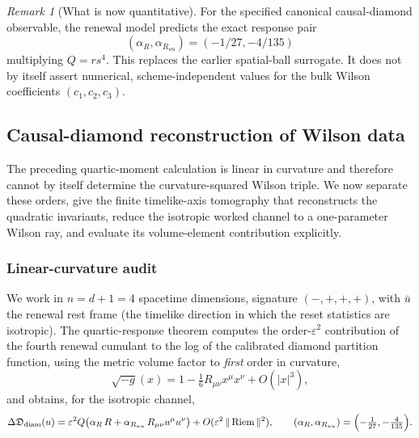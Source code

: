\documentclass[11pt]{article}
\theoremstyle{definition}
\theoremstyle{remark}
\newtheorem{remark}[theorem]{Remark}
\newcommand{\eps}{\varepsilon}
\newcommand{\Riem}{\operatorname{Riem}}
\begin{document}
\begin{remark}[What is now quantitative]
\label{rem:diamond-response-scope}
For the specified canonical causal-diamond observable, the renewal model predicts
the exact response pair
\[
 (\alpha_R,\alpha_{R_{uu}})=(-1/27,-4/135)
\]
multiplying $Q=rs^4$.  This replaces the earlier spatial-ball surrogate.
It does not by itself assert numerical, scheme-independent values for the bulk
Wilson coefficients $(c_1,c_2,c_3)$.
\end{remark}


\subsection{Causal-diamond reconstruction of Wilson data}
\label{subsec:covariant-wilson-reconstruction}

The preceding quartic-moment calculation is linear in curvature and therefore cannot by itself determine the curvature-squared Wilson triple.  We now separate these orders, give the finite timelike-axis tomography that reconstructs the quadratic invariants, reduce the isotropic worked channel to a one-parameter Wilson ray, and evaluate its volume-element contribution explicitly.

\subsubsection{Linear-curvature audit}
\label{subsec:curvature-order-audit}

We work in $n=d+1=4$ spacetime dimensions, signature $(-,+,+,+)$, with $\bar u$
the renewal rest frame (the timelike direction in which the reset statistics are
isotropic).  The quartic-response theorem computes the order-$\eps^2$
contribution of the fourth renewal cumulant to the log of the calibrated diamond
partition function, using the metric volume factor to \emph{first} order in
curvature,
\begin{equation}
\label{eq:vol-linear}
 \sqrt{-g}(x)=1-\tfrac16 R_{\mu\nu}x^\mu x^\nu+O(|x|^3),
\end{equation}
and obtains, for the isotropic channel,
\begin{equation}
\label{eq:diamond-linear}
 \Delta\mathfrak D_{\mathrm{diam}}(u)
 =\eps^2 Q\bigl(\alpha_R\,R+\alpha_{R_{uu}}\,R_{\mu\nu}u^\mu u^\nu\bigr)
 +O(\eps^2\,\|\Riem\|^2),
 \qquad
 (\alpha_R,\alpha_{R_{uu}})=\Bigl(-\tfrac1{27},-\tfrac4{135}\Bigr).
\end{equation}
\end{document}
